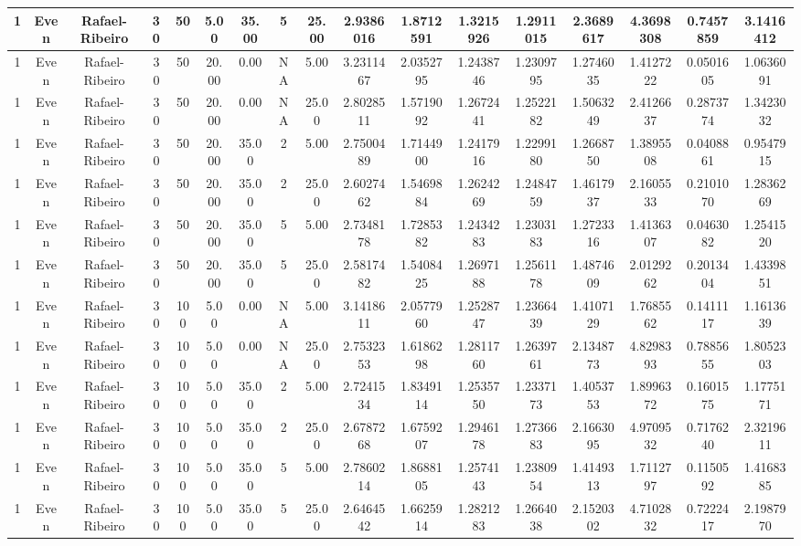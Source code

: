 \begin{longtable}{ | c | c | c | c | c | c | c | c | c | c | c | c | c | c | c | c | c | }
	\hline
	1	&	Even	&	Rafael-Ribeiro	&	30	&	50	&	5.00	&	35.00	&	5	&	25.00	&	2.9386016	&	1.8712591	&	1.3215926	&	1.2911015	&	2.3689617	&	4.3698308	&	0.7457859	&	3.1416412 \\
	\hline
	1	&	Even	&	Rafael-Ribeiro	&	30	&	50	&	20.00	&	0.00	&	NA	&	5.00	&	3.2311467	&	2.0352795	&	1.2438746	&	1.2309795	&	1.2746035	&	1.4127222	&	0.0501605	&	1.0636091 \\
	\hline
	1	&	Even	&	Rafael-Ribeiro	&	30	&	50	&	20.00	&	0.00	&	NA	&	25.00	&	2.8028511	&	1.5719092	&	1.2672441	&	1.2522182	&	1.5063249	&	2.4126637	&	0.2873774	&	1.3423032 \\
	\hline
	1	&	Even	&	Rafael-Ribeiro	&	30	&	50	&	20.00	&	35.00	&	2	&	5.00	&	2.7500489	&	1.7144900	&	1.2417916	&	1.2299180	&	1.2668750	&	1.3895508	&	0.0408861	&	0.9547915 \\
	\hline
	1	&	Even	&	Rafael-Ribeiro	&	30	&	50	&	20.00	&	35.00	&	2	&	25.00	&	2.6027462	&	1.5469884	&	1.2624269	&	1.2484759	&	1.4617937	&	2.1605533	&	0.2101070	&	1.2836269 \\
	\hline
	1	&	Even	&	Rafael-Ribeiro	&	30	&	50	&	20.00	&	35.00	&	5	&	5.00	&	2.7348178	&	1.7285382	&	1.2434283	&	1.2303183	&	1.2723316	&	1.4136307	&	0.0463082	&	1.2541520 \\
	\hline
	1	&	Even	&	Rafael-Ribeiro	&	30	&	50	&	20.00	&	35.00	&	5	&	25.00	&	2.5817482	&	1.5408425	&	1.2697188	&	1.2561178	&	1.4874609	&	2.0129262	&	0.2013404	&	1.4339851 \\
	\hline
	1	&	Even	&	Rafael-Ribeiro	&	30	&	100	&	5.00	&	0.00	&	NA	&	5.00	&	3.1418611	&	2.0577960	&	1.2528747	&	1.2366439	&	1.4107129	&	1.7685562	&	0.1411117	&	1.1613639 \\
	\hline
	1	&	Even	&	Rafael-Ribeiro	&	30	&	100	&	5.00	&	0.00	&	NA	&	25.00	&	2.7532353	&	1.6186298	&	1.2811760	&	1.2639761	&	2.1348773	&	4.8298393	&	0.7885655	&	1.8052303 \\
	\hline
	1	&	Even	&	Rafael-Ribeiro	&	30	&	100	&	5.00	&	35.00	&	2	&	5.00	&	2.7241534	&	1.8349114	&	1.2535750	&	1.2337173	&	1.4053753	&	1.8996372	&	0.1601575	&	1.1775171 \\
	\hline
	1	&	Even	&	Rafael-Ribeiro	&	30	&	100	&	5.00	&	35.00	&	2	&	25.00	&	2.6787268	&	1.6759207	&	1.2946178	&	1.2736683	&	2.1663095	&	4.9709532	&	0.7176240	&	2.3219611 \\
	\hline
	1	&	Even	&	Rafael-Ribeiro	&	30	&	100	&	5.00	&	35.00	&	5	&	5.00	&	2.7860214	&	1.8688105	&	1.2574143	&	1.2380954	&	1.4149313	&	1.7112797	&	0.1150592	&	1.4168385 \\
	\hline
	1	&	Even	&	Rafael-Ribeiro	&	30	&	100	&	5.00	&	35.00	&	5	&	25.00	&	2.6464542	&	1.6625914	&	1.2821283	&	1.2664038	&	2.1520302	&	4.7102832	&	0.7222417	&	2.1987970 \\

\end{longtable}
